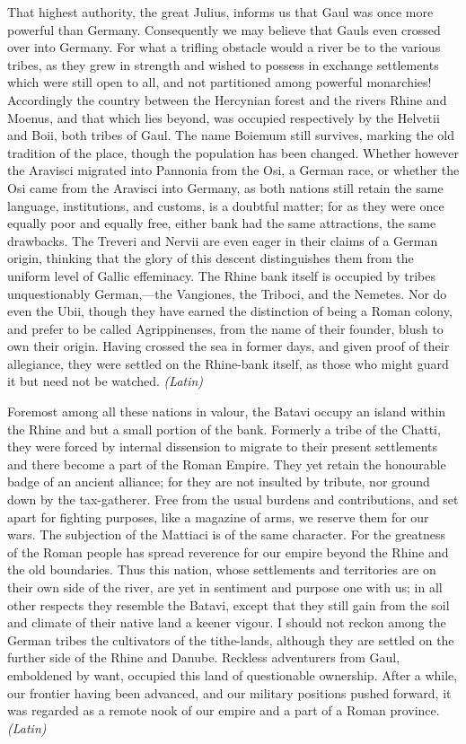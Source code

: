 
That highest authority, the great Julius, informs us that Gaul was once more powerful than Germany. Consequently we may believe that Gauls even crossed over into Germany. For what a trifling obstacle would a river be to the various tribes, as they grew in strength and wished to possess in exchange settlements which were still open to all, and not partitioned among powerful monarchies! Accordingly the country between the Hercynian forest and the rivers Rhine and Moenus, and that which lies beyond, was occupied respectively by the Helvetii and Boii, both tribes of Gaul. The name Boiemum still survives, marking the old tradition of the place, though the population has been changed. Whether however the Aravisci migrated into Pannonia from the Osi, a German race, or whether the Osi came from the Aravisci into Germany, as both nations still retain the same language, institutions, and customs, is a doubtful matter; for as they were once equally poor and equally free, either bank had the same attractions, the same drawbacks. The Treveri and Nervii are even eager in their claims of a German origin, thinking that the glory of this descent distinguishes them from the uniform level of Gallic effeminacy. The Rhine bank itself is occupied by tribes unquestionably German,—the Vangiones, the Triboci, and the Nemetes. Nor do even the Ubii, though they have earned the distinction of being a Roman colony, and prefer to be called Agrippinenses, from the name of their founder, blush to own their origin. Having crossed the sea in former days, and given proof of their allegiance, they were settled on the Rhine-bank itself, as those who might guard it but need not be watched. \emph{(Latin)}


Foremost among all these nations in valour, the Batavi occupy an island within the Rhine and but a small portion of the bank. Formerly a tribe of the Chatti, they were forced by internal dissension to migrate to their present settlements and there become a part of the Roman Empire. They yet retain the honourable badge of an ancient alliance; for they are not insulted by tribute, nor ground down by the tax-gatherer. Free from the usual burdens and contributions, and set apart for fighting purposes, like a magazine of arms, we reserve them for our wars. The subjection of the Mattiaci is of the same character. For the greatness of the Roman people has spread reverence for our empire beyond the Rhine and the old boundaries. Thus this nation, whose settlements and territories are on their own side of the river, are yet in sentiment and purpose one with us; in all other respects they resemble the Batavi, except that they still gain from the soil and climate of their native land a keener vigour. I should not reckon among the German tribes the cultivators of the tithe-lands, although they are settled on the further side of the Rhine and Danube. Reckless adventurers from Gaul, emboldened by want, occupied this land of questionable ownership. After a while, our frontier having been advanced, and our military positions pushed forward, it was regarded as a remote nook of our empire and a part of a Roman province. \emph{(Latin)}

